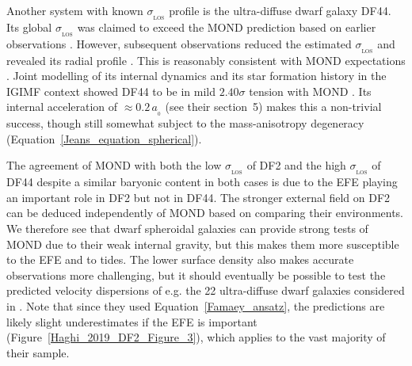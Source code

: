 \documentclass[fleqn,usenatbib,useAMS,onecolumn]{mnras} %
\begin{document}
Another system with known $\sigma_{_\text{LOS}}$ profile is the ultra-diffuse dwarf galaxy DF44. Its global $\sigma_{_\text{LOS}}$ was claimed to exceed the MOND prediction \citep{Hodson_2017_UDG} based on earlier observations \citep{Van_Dokkum_2016}. However, subsequent observations reduced the estimated $\sigma_{_\text{LOS}}$ and revealed its radial profile \citep{Van_Dokkum_2019}. This is reasonably consistent with MOND expectations \citep{Bilek_2019}. Joint modelling of its internal dynamics and its star formation history in the IGIMF context showed DF44 to be in mild $2.40\sigma$ tension with MOND \citep{Haghi_2019_DF44}. Its internal acceleration of $\approx 0.2 \, a_{_0}$ (see their section~5) makes this a non-trivial success, though still somewhat subject to the mass-anisotropy degeneracy (Equation~\ref{Jeans_equation_spherical}).

The agreement of MOND with both the low $\sigma_{_\text{LOS}}$ of DF2 and the high $\sigma_{_\text{LOS}}$ of DF44 despite a similar baryonic content in both cases is due to the EFE playing an important role in DF2 but not in DF44. The stronger external field on DF2 can be deduced independently of MOND based on comparing their environments. We therefore see that dwarf spheroidal galaxies can provide strong tests of MOND due to their weak internal gravity, but this makes them more susceptible to the EFE and to tides. The lower surface density also makes accurate observations more challenging, but it should eventually be possible to test the predicted velocity dispersions of e.g. the 22 ultra-diffuse dwarf galaxies considered in \citet{Muller_2019}. Note that since they used Equation~\ref{Famaey_ansatz}, the predictions are likely slight underestimates if the EFE is important (Figure~\ref{Haghi_2019_DF2_Figure_3}), which applies to the vast majority of their sample.
\end{document}
